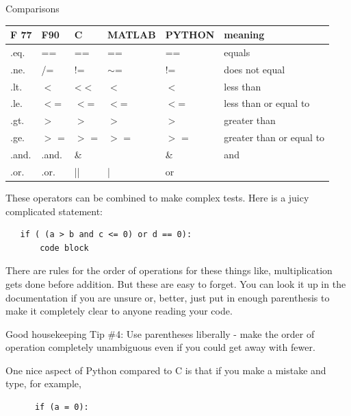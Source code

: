 \documentclass[11pt]{book}
\begin{document}
{{{{\centerline{Comparisons}
\begin{tabular}{llllll}
\hline
F 77  \qquad &   F90    \qquad &  C    \qquad & MATLAB  \qquad & PYTHON  \qquad & meaning\\
\hline
.eq.  \qquad &  ==   \qquad &   ==    \qquad &  ==  \qquad &     ==   \qquad &  equals\\
.ne. \qquad &   /=  \qquad &    !=   \qquad &   $\sim$=    \qquad &   !=  \qquad &   does not equal\\
.lt.  \qquad &  $<$   \qquad &    <$<$  \qquad &     $<$  \qquad &   $<$  \qquad &    less than\\
.le.  \qquad &  $<$= \qquad &     $<$=   \qquad &  $<$=   \qquad &    $<$=  \qquad &   less than or equal to\\
.gt.  \qquad & $>$ \qquad &      $>$    \qquad &   $>$    \qquad & $>$   \qquad &    greater than\\
.ge.  \qquad &  $>$ =   \qquad &   $>$ =   \qquad &  $>$ =  \qquad &    $>$ =  \qquad &   greater than or equal to\\
.and. \qquad & .and. \qquad &   \&\qquad &    \qquad &  \&  \qquad &      and\\
.or.  \qquad & .or.  \qquad &    ||    \qquad &  |   \qquad &     or \\
\hline
\end{tabular}


These operators can be combined to make complex tests.  Here is a juicy complicated statement:

{ \color{blue} \begin{verbatim}
   if ( (a > b and c <= 0) or d == 0):
       code block
   \end{verbatim}}
\noindent
There are rules for the order of operations for these things like, multiplication gets done before addition.   But these are easy to forget.  You can look it up in the documentation if
you are unsure or, better, just put in enough parenthesis to
make it completely clear to anyone reading your code.

\noindent
{\color{magenta}Good housekeeping Tip \#4: Use parentheses liberally - make the order of operation completely unambiguous even if you could get away with fewer. }


One nice aspect of Python compared to C is that if you make
a mistake and type, for example,

{\color{blue}   \begin{verbatim}
      if (a = 0):
         \end{verbatim}}

}}}}
\end{document}
